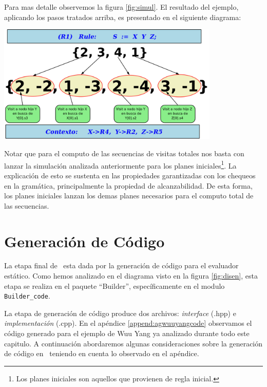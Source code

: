 Para mas detalle observemos la figura \ref{fig:simul}.
\newpage
El resultado del ejemplo, aplicando los pasos tratados arriba, es presentado en el siguiente diagrama:
\begin{center}
\includegraphics[width=300pt,height=160pt]{plan2seq.png}
\end{center}
Notar que para el computo de las secuencias de visitas totales nos basta con lanzar la simulación analizada anteriormente para los planes iniciales\footnote{Los planes iniciales son aquellos que provienen de regla inicial.}. La explicación de esto se sustenta en las propiedades garantizadas con los chequeos en la gramática, principalmente la propiedad de alcanzabilidad. De esta forma, los planes iniciales lanzan los demas planes necesarios para el computo total de las secuencias.


\section{Generación de Código}
La etapa final de \maggen\ esta dada por la generación de código para el evaluador estático. Como hemos analizado en el diagrama visto en la figura \ref{fig:disen}, esta etapa se realiza en el paquete ``Builder'', específicamente en el modulo \texttt{Builder\_code}.

La etapa de generación de código produce dos archivos: \textit{interface} (.hpp) e \textit{implementación} (.cpp). En el apéndice \ref{append:agwuuyangcode} observamos el código generado para el ejemplo de Wuu Yang ya analizado durante todo este capitulo.
A continuación abordaremos algunas consideraciones sobre la generación de código en \maggen\ teniendo en cuenta lo observado en el apéndice.

